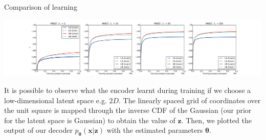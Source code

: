 \documentclass[landscape,a0b,final,a4resizeable]{include/a0poster}
\begin{document}
\begin{poster}
\begin{multicols}{3}

Comparison of learning

\vspace{0.5em}

\begin{center}
\includegraphics[width=.8\columnwidth]{../res/mnist_LAvsLB}
\end{center}

\vspace{0.5em}


It is possible to observe what the encoder learnt during training if we choose a low-dimensional latent space e.g. $2D$. The linearly spaced grid of coordinates over the unit square is mapped through the inverse CDF of the Gaussian (our prior for the latent space is Gaussian) to obtain the value of $\mathbf{z}$. Then, we plotted the output of our decoder $p_{\mathbf{\theta}} (\mathbf{x}| \mathbf{z})$ with the estimated parameters $\mathbf{\theta}$.

\vspace{0.5em}


\end{multicols}
\end{poster}
\end{document}
